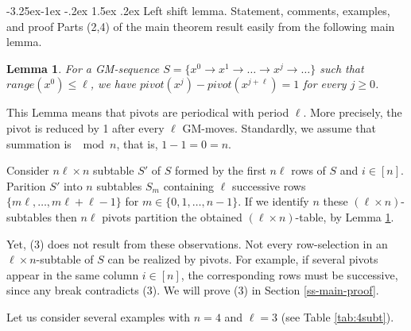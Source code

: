 \documentclass[10pt]{article}
\makeatletter
\renewcommand\subsection{\@startsection{subsection}{2}{\z@}
{-3.25ex\@plus -1ex \@minus -.2ex}
{1.5ex \@plus .2ex}
{\normalfont\normalsize\bfseries\boldmath}}
\newtheorem{lemma}{Lemma}
\theoremstyle{definition}
\makeatother
\begin{document}
\subsection{Left shift lemma. Statement, comments, examples, and proof}
Parts (2,4) of the main theorem 
result easily from the following main lemma.   

\begin{lemma} 
\label{l-main} 
For a GM-sequence 
$S = \{x^0 \to x^1 \to \ldots \to x^j \to \ldots\}$ 
such that $range(x^0) \leq \ell$, we have 
$pivot(x^j) - pivot(x^{j+\ell}) = 1$ for every $j \geq 0$.
\end{lemma} 

This Lemma means that pivots are periodical with period  $\ell$.  
More precisely, the pivot is reduced by 1 after every $\ell$ GM-moves. 
Standardly, we assume that summation is $\mod n$, 
that is, $1 - 1 = 0 = n$.  

Consider $n \ell \times n$ subtable $S'$ of $S$  
formed by the first $n \ell$ rows of $S$  and $i \in [n]$. 
Parition  $S'$ into  $n$  subtables  %
$S_m$ containing $\ell$ successive rows 
$\{m \ell, \ldots, m \ell +\ell - 1\}$  for    
$m \in \{0,1, \ldots, n-1\}$.   
If we identify $n$  these  $(\ell \times n)$-subtables 
then $n \ell$  pivots partition the obtained 
$(\ell \times n)$-table, by Lemma \ref{l-main}.

Yet, (3) does not result from these observations. 
Not every row-selection in an $\ell \times n$-subtable of $S$ 
can be realized by pivots. 
For example, if several pivots appear in the same 
column  $i \in [n]$, the corresponding rows must be successive, 
since any break contradicts (3).
We will prove (3) in Section \ref{ss-main-proof}.

\medskip 

Let us consider several examples 
with $n=4$ and  $\ell = 3$ (see Table \ref{tab:4subt}).
\end{document}
